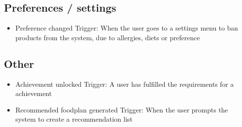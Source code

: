 \subsection{Preferences / settings}
\begin{itemize}
\item Preference changed
	\subitem Trigger: When the user goes to a settings menu to ban products from the system, due to allergies, diets or preference
\end{itemize}


\subsection{Other}
\begin{itemize}
\item Achievement unlocked
	\subitem Trigger: A user has fulfilled the requirements for a achievement  
\item Recommended foodplan generated
	\subitem Trigger: When the user prompts the system to create a recommendation list
\end{itemize}

